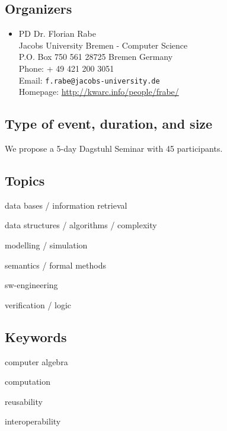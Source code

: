 \documentclass[a4paper,11pt]{article}
\begin{document}
\subsection{Organizers}

\begin{itemize}
\item PD Dr. Florian Rabe \\
Jacobs University Bremen - Computer Science\\
P.O. Box 750 561
28725 Bremen Germany
\\
Phone: + 49 421 200 3051\\
Email: \texttt{f.rabe@jacobs-university.de}  \\
Homepage: \url{http://kwarc.info/people/frabe/}
\end{itemize}

\subsection{Type of event, duration, and size}

We propose a 5-day Dagstuhl Seminar with 45 participants.

\subsection{Topics}

\begin{compactitem}
 \item data bases / information retrieval
 \item data structures / algorithms / complexity
 \item modelling / simulation
 \item semantics / formal methods
 \item sw-engineering
 \item verification / logic
\end{compactitem}

\subsection{Keywords}

\begin{compactitem}
\item computer algebra
\item computation
\item reusability
\item interoperability
\end{compactitem}
\end{document}
